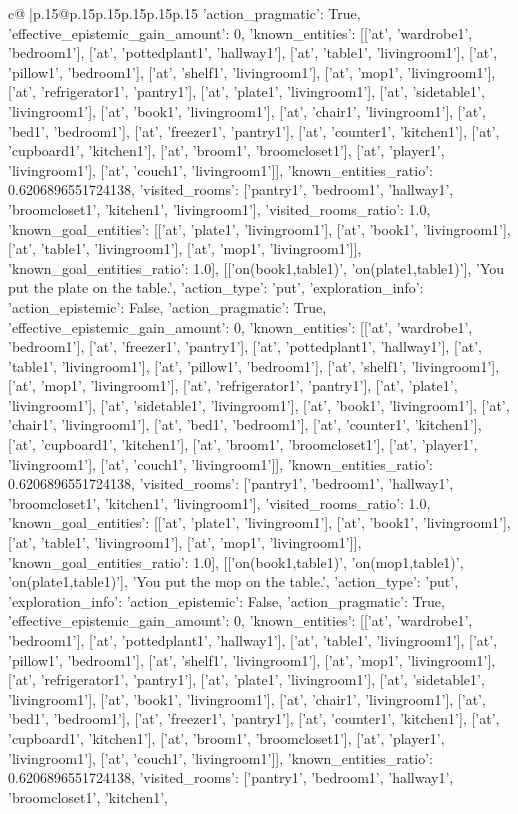 \documentclass{article}
\begin{document}
{\begin{supertabular}{c@{$\;$}|p{.15\linewidth}@{}p{.15\linewidth}p{.15\linewidth}p{.15\linewidth}p{.15\linewidth}p{.15\linewidth}}
{{{'action_pragmatic': True, 'effective_epistemic_gain_amount': 0, 'known_entities': [['at', 'wardrobe1', 'bedroom1'], ['at', 'pottedplant1', 'hallway1'], ['at', 'table1', 'livingroom1'], ['at', 'pillow1', 'bedroom1'], ['at', 'shelf1', 'livingroom1'], ['at', 'mop1', 'livingroom1'], ['at', 'refrigerator1', 'pantry1'], ['at', 'plate1', 'livingroom1'], ['at', 'sidetable1', 'livingroom1'], ['at', 'book1', 'livingroom1'], ['at', 'chair1', 'livingroom1'], ['at', 'bed1', 'bedroom1'], ['at', 'freezer1', 'pantry1'], ['at', 'counter1', 'kitchen1'], ['at', 'cupboard1', 'kitchen1'], ['at', 'broom1', 'broomcloset1'], ['at', 'player1', 'livingroom1'], ['at', 'couch1', 'livingroom1']], 'known_entities_ratio': 0.6206896551724138, 'visited_rooms': ['pantry1', 'bedroom1', 'hallway1', 'broomcloset1', 'kitchen1', 'livingroom1'], 'visited_rooms_ratio': 1.0, 'known_goal_entities': [['at', 'plate1', 'livingroom1'], ['at', 'book1', 'livingroom1'], ['at', 'table1', 'livingroom1'], ['at', 'mop1', 'livingroom1']], 'known_goal_entities_ratio': 1.0}}], [['on(book1,table1)', 'on(plate1,table1)'], 'You put the plate on the table.', {'action_type': 'put', 'exploration_info': {'action_epistemic': False, 'action_pragmatic': True, 'effective_epistemic_gain_amount': 0, 'known_entities': [['at', 'wardrobe1', 'bedroom1'], ['at', 'freezer1', 'pantry1'], ['at', 'pottedplant1', 'hallway1'], ['at', 'table1', 'livingroom1'], ['at', 'pillow1', 'bedroom1'], ['at', 'shelf1', 'livingroom1'], ['at', 'mop1', 'livingroom1'], ['at', 'refrigerator1', 'pantry1'], ['at', 'plate1', 'livingroom1'], ['at', 'sidetable1', 'livingroom1'], ['at', 'book1', 'livingroom1'], ['at', 'chair1', 'livingroom1'], ['at', 'bed1', 'bedroom1'], ['at', 'counter1', 'kitchen1'], ['at', 'cupboard1', 'kitchen1'], ['at', 'broom1', 'broomcloset1'], ['at', 'player1', 'livingroom1'], ['at', 'couch1', 'livingroom1']], 'known_entities_ratio': 0.6206896551724138, 'visited_rooms': ['pantry1', 'bedroom1', 'hallway1', 'broomcloset1', 'kitchen1', 'livingroom1'], 'visited_rooms_ratio': 1.0, 'known_goal_entities': [['at', 'plate1', 'livingroom1'], ['at', 'book1', 'livingroom1'], ['at', 'table1', 'livingroom1'], ['at', 'mop1', 'livingroom1']], 'known_goal_entities_ratio': 1.0}}], [['on(book1,table1)', 'on(mop1,table1)', 'on(plate1,table1)'], 'You put the mop on the table.', {'action_type': 'put', 'exploration_info': {'action_epistemic': False, 'action_pragmatic': True, 'effective_epistemic_gain_amount': 0, 'known_entities': [['at', 'wardrobe1', 'bedroom1'], ['at', 'pottedplant1', 'hallway1'], ['at', 'table1', 'livingroom1'], ['at', 'pillow1', 'bedroom1'], ['at', 'shelf1', 'livingroom1'], ['at', 'mop1', 'livingroom1'], ['at', 'refrigerator1', 'pantry1'], ['at', 'plate1', 'livingroom1'], ['at', 'sidetable1', 'livingroom1'], ['at', 'book1', 'livingroom1'], ['at', 'chair1', 'livingroom1'], ['at', 'bed1', 'bedroom1'], ['at', 'freezer1', 'pantry1'], ['at', 'counter1', 'kitchen1'], ['at', 'cupboard1', 'kitchen1'], ['at', 'broom1', 'broomcloset1'], ['at', 'player1', 'livingroom1'], ['at', 'couch1', 'livingroom1']], 'known_entities_ratio': 0.6206896551724138, 'visited_rooms': ['pantry1', 'bedroom1', 'hallway1', 'broomcloset1', 'kitchen1', }}}
\end{supertabular}}
\end{document}
